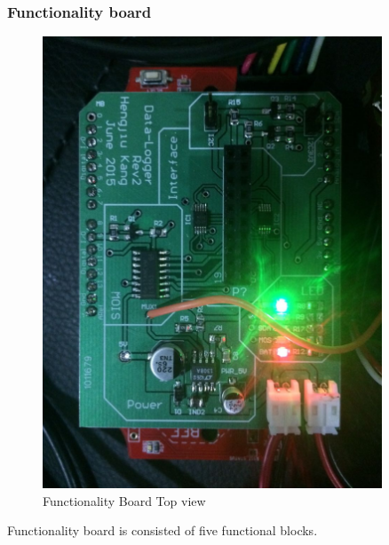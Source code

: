     \subsubsection{Functionality board}
    \begin{figure}[H]
    \centering
    \includegraphics[width=0.9\textwidth]{func_board_top.jpg}
    \caption{\label{fig:Func Board}Functionality Board Top view}
    \end{figure}
    Functionality board is consisted of five functional blocks.
